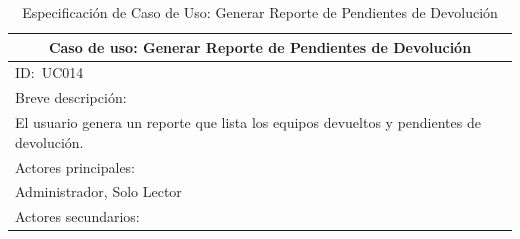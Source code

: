 \documentclass[stu, 12pt, letterpaper, donotrepeattitle, floatsintext, natbib]{apa7}
\begin{document}
\begin{longtable}{@{} p{16.5cm} @{}}
    \caption{Especificación de Caso de Uso: Generar Reporte de Pendientes de Devolución}\label{tab:UC014}                                                                                                                                                                          \\ \toprule
    \multicolumn{1}{c}{Caso de uso: Generar Reporte de Pendientes de Devolución}                                                                                                                                                                                                   \\ \midrule
    ID:~UC014                                                                                                                                                                                                                                                                      \\ \midrule
    Breve descripción:                                                                                                                                                                                                                                                             \\
    El usuario genera un reporte que lista los equipos devueltos y pendientes de devolución.                                                                                                                                                                                       \\ \midrule
    Actores principales:                                                                                                                                                                                                                                                           \\
    Administrador, Solo Lector                                                                                                                                                                                                                                                     \\ \midrule
    Actores secundarios:                                                                                                                                                                                                                                                           \\

\end{longtable}
\end{document}
